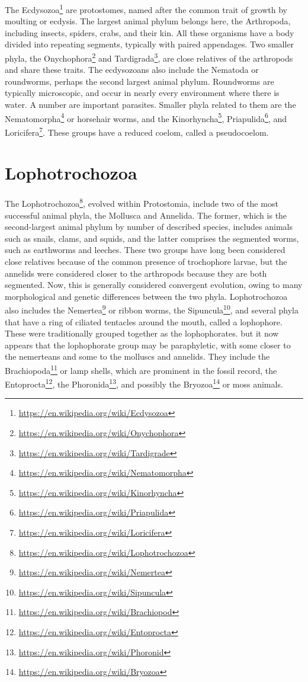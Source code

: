 \documentclass[]{book}
\let\rmarkdownfootnote\footnote%
\def\footnote{\protect\rmarkdownfootnote}
\renewcommand{\href}[2]{#2\footnote{\url{#1}}}
\begin{document}
The \href{https://en.wikipedia.org/wiki/Ecdysozoa}{Ecdysozoa} are protostomes, named after the common trait of growth by moulting or ecdysis. The largest animal phylum belongs here, the Arthropoda, including insects, spiders, crabs, and their kin. All these organisms have a body divided into repeating segments, typically with paired appendages. Two smaller phyla, the \href{https://en.wikipedia.org/wiki/Onychophora}{Onychophora} and \href{https://en.wikipedia.org/wiki/Tardigrade}{Tardigrada}, are close relatives of the arthropods and share these traits. The ecdysozoans also include the Nematoda or roundworms, perhaps the second largest animal phylum. Roundworms are typically microscopic, and occur in nearly every environment where there is water. A number are important parasites. Smaller phyla related to them are the \href{https://en.wikipedia.org/wiki/Nematomorpha}{Nematomorpha} or horsehair worms, and the \href{https://en.wikipedia.org/wiki/Kinorhyncha}{Kinorhyncha}, \href{https://en.wikipedia.org/wiki/Priapulida}{Priapulida}, and \href{https://en.wikipedia.org/wiki/Loricifera}{Loricifera}. These groups have a reduced coelom, called a pseudocoelom.

\hypertarget{lophotrochozoa}{%
\section{Lophotrochozoa}\label{lophotrochozoa}}

The \href{https://en.wikipedia.org/wiki/Lophotrochozoa}{Lophotrochozoa}, evolved within Protostomia, include two of the most successful animal phyla, the Mollusca and Annelida. The former, which is the second-largest animal phylum by number of described species, includes animals such as snails, clams, and squids, and the latter comprises the segmented worms, such as earthworms and leeches. These two groups have long been considered close relatives because of the common presence of trochophore larvae, but the annelids were considered closer to the arthropods because they are both segmented. Now, this is generally considered convergent evolution, owing to many morphological and genetic differences between the two phyla. Lophotrochozoa also includes the \href{https://en.wikipedia.org/wiki/Nemertea}{Nemertea} or ribbon worms, the \href{https://en.wikipedia.org/wiki/Sipuncula}{Sipuncula}, and several phyla that have a ring of ciliated tentacles around the mouth, called a lophophore. These were traditionally grouped together as the lophophorates. but it now appears that the lophophorate group may be paraphyletic, with some closer to the nemerteans and some to the molluscs and annelids. They include the \href{https://en.wikipedia.org/wiki/Brachiopod}{Brachiopoda} or lamp shells, which are prominent in the fossil record, the \href{https://en.wikipedia.org/wiki/Entoprocta}{Entoprocta}, the \href{https://en.wikipedia.org/wiki/Phoronid}{Phoronida}, and possibly the \href{https://en.wikipedia.org/wiki/Bryozoa}{Bryozoa} or moss animals.
\end{document}
